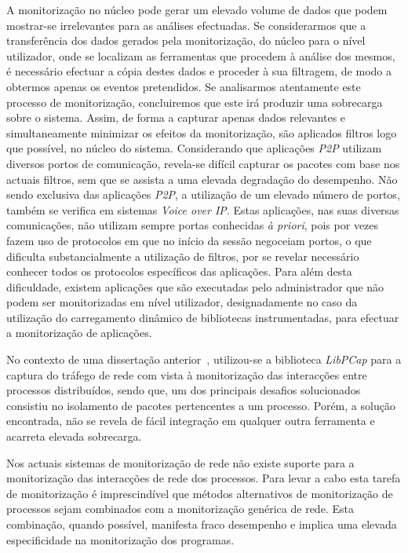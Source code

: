 A monitorização no núcleo pode gerar um elevado volume de dados que podem mostrar-se irrelevantes para as análises efectuadas.
Se considerarmos que a transferência dos dados gerados pela monitorização, do núcleo para o nível utilizador, onde se localizam as ferramentas que procedem à análise dos mesmos, é necessário efectuar a cópia destes dados e proceder à sua filtragem, de modo a obtermos apenas os eventos pretendidos.
Se analisarmos atentamente este processo de monitorização, concluiremos que este irá produzir uma sobrecarga sobre o sistema.
Assim, de forma a capturar apenas dados relevantes e simultaneamente minimizar os efeitos da monitorização, são aplicados filtros logo que possível, no núcleo do sistema.
Considerando que aplicações \textit{P2P} utilizam diversos portos de comunicação, revela-se difícil capturar os pacotes com base nos actuais filtros, sem que se assista a uma elevada degradação do desempenho.
Não sendo exclusiva das aplicações \textit{P2P}, a utilização de um elevado número de portos, também se verifica em sistemas \textit{Voice over IP}.
Estas aplicações, nas suas diversas comunicações, não utilizam sempre portas conhecidas \textit{à priori}, pois por vezes fazem uso de protocolos em que no início da sessão negoceiam portos, o que dificulta substancialmente a utilização de filtros, por se revelar necessário conhecer todos os protocolos específicos das aplicações.
Para além desta dificuldade, existem aplicações que são executadas pelo administrador que não podem ser monitorizadas em nível utilizador, designadamente no caso da utilização do carregamento dinâmico de bibliotecas instrumentadas, para efectuar a monitorização de aplicações.

No contexto de uma dissertação anterior~\cite{Farruca:2009}, utilizou-se a biblioteca \textit{LibPCap} para a captura do tráfego de rede com vista à monitorização das interacções entre processos distribuídos, sendo que, um dos principais desafios solucionados consistiu no isolamento de pacotes pertencentes a um processo.
Porém, a solução encontrada, não se revela de fácil integração em qualquer outra ferramenta e acarreta elevada sobrecarga.

Nos actuais sistemas de monitorização de rede não existe suporte para a monitorização das interacções de rede dos processos.
Para levar a cabo esta tarefa de monitorização é imprescindível que métodos alternativos de monitorização de processos sejam combinados com a monitorização genérica de rede.
Esta combinação, quando possível, manifesta fraco desempenho e implica uma elevada especificidade na monitorização dos programas.


